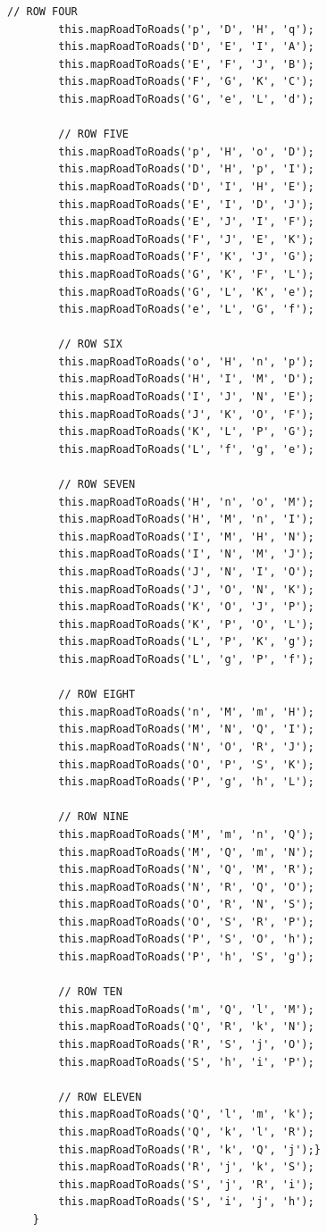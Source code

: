 \documentclass{fank1basedocument}
\begin{document}
\begin{lstlisting}[style=javacode,language=myJava]
		// ROW FOUR
		this.mapRoadToRoads('p', 'D', 'H', 'q');
		this.mapRoadToRoads('D', 'E', 'I', 'A');
		this.mapRoadToRoads('E', 'F', 'J', 'B');
		this.mapRoadToRoads('F', 'G', 'K', 'C');
		this.mapRoadToRoads('G', 'e', 'L', 'd');

		// ROW FIVE
		this.mapRoadToRoads('p', 'H', 'o', 'D');
		this.mapRoadToRoads('D', 'H', 'p', 'I');
		this.mapRoadToRoads('D', 'I', 'H', 'E');
		this.mapRoadToRoads('E', 'I', 'D', 'J');
		this.mapRoadToRoads('E', 'J', 'I', 'F');
		this.mapRoadToRoads('F', 'J', 'E', 'K');
		this.mapRoadToRoads('F', 'K', 'J', 'G');
		this.mapRoadToRoads('G', 'K', 'F', 'L');
		this.mapRoadToRoads('G', 'L', 'K', 'e');
		this.mapRoadToRoads('e', 'L', 'G', 'f');

		// ROW SIX
		this.mapRoadToRoads('o', 'H', 'n', 'p');
		this.mapRoadToRoads('H', 'I', 'M', 'D');
		this.mapRoadToRoads('I', 'J', 'N', 'E');
		this.mapRoadToRoads('J', 'K', 'O', 'F');
		this.mapRoadToRoads('K', 'L', 'P', 'G');
		this.mapRoadToRoads('L', 'f', 'g', 'e');

		// ROW SEVEN
		this.mapRoadToRoads('H', 'n', 'o', 'M');
		this.mapRoadToRoads('H', 'M', 'n', 'I');
		this.mapRoadToRoads('I', 'M', 'H', 'N');
		this.mapRoadToRoads('I', 'N', 'M', 'J');
		this.mapRoadToRoads('J', 'N', 'I', 'O');
		this.mapRoadToRoads('J', 'O', 'N', 'K');
		this.mapRoadToRoads('K', 'O', 'J', 'P');
		this.mapRoadToRoads('K', 'P', 'O', 'L');
		this.mapRoadToRoads('L', 'P', 'K', 'g');
		this.mapRoadToRoads('L', 'g', 'P', 'f');

		// ROW EIGHT
		this.mapRoadToRoads('n', 'M', 'm', 'H');
		this.mapRoadToRoads('M', 'N', 'Q', 'I');
		this.mapRoadToRoads('N', 'O', 'R', 'J');
		this.mapRoadToRoads('O', 'P', 'S', 'K');
		this.mapRoadToRoads('P', 'g', 'h', 'L');

		// ROW NINE
		this.mapRoadToRoads('M', 'm', 'n', 'Q');
		this.mapRoadToRoads('M', 'Q', 'm', 'N');
		this.mapRoadToRoads('N', 'Q', 'M', 'R');
		this.mapRoadToRoads('N', 'R', 'Q', 'O');
		this.mapRoadToRoads('O', 'R', 'N', 'S');
		this.mapRoadToRoads('O', 'S', 'R', 'P');
		this.mapRoadToRoads('P', 'S', 'O', 'h');
		this.mapRoadToRoads('P', 'h', 'S', 'g');

		// ROW TEN
		this.mapRoadToRoads('m', 'Q', 'l', 'M');
		this.mapRoadToRoads('Q', 'R', 'k', 'N');
		this.mapRoadToRoads('R', 'S', 'j', 'O');
		this.mapRoadToRoads('S', 'h', 'i', 'P');

		// ROW ELEVEN
		this.mapRoadToRoads('Q', 'l', 'm', 'k');
		this.mapRoadToRoads('Q', 'k', 'l', 'R');
		this.mapRoadToRoads('R', 'k', 'Q', 'j');}
		this.mapRoadToRoads('R', 'j', 'k', 'S');
		this.mapRoadToRoads('S', 'j', 'R', 'i');
		this.mapRoadToRoads('S', 'i', 'j', 'h');
	}


\end{lstlisting}
\end{document}
